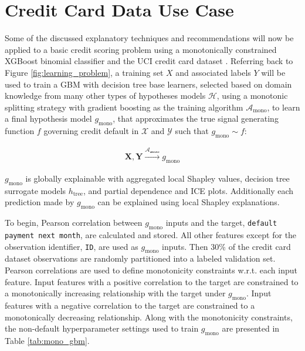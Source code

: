 \documentclass[11pt]{asaproc}
\begin{document}
\section{Credit Card Data Use Case} \label{sec:use_case}

Some of the discussed explanatory techniques and recommendations will now be applied to a basic credit scoring problem using a monotonically constrained XGBoost binomial classifier and the UCI credit card dataset \cite{uci}. Referring back to Figure \ref{fig:learning_problem}, a training set $X$ and associated labels $Y$ will be used to train a GBM with decision tree base learners, selected based on domain knowledge from many other types of hypotheses models $\mathcal{H}$, using a monotonic splitting strategy with gradient boosting as the training algorithm $\mathcal{A}_{\text{mono}}$, to learn a final hypothesis model $g_{\text{mono}}$, that approximates the true signal generating function $f$ governing credit default in $\mathcal{X}$ and $\mathcal{Y}$ such that $g_{\text{mono}} \sim f$:

\begin{equation}
\label{eq:cc_training}
\begin{aligned}
\mathbf{X}, \mathbf{Y} \xrightarrow{\mathcal{A_{\text{mono}}}} g_{\text{mono}}
\end{aligned}
\end{equation}

\noindent$g_{\text{mono}}$ is globally explainable with aggregated local Shapley values, decision tree surrogate models $h_{\text{tree}}$, and partial dependence and ICE plots. Additionally each prediction made by $g_{\text{mono}}$ can be explained using local Shapley explanations. 

To begin, Pearson correlation between $g_{\text{mono}}$ inputs and the target, \texttt{default payment next month}, are calculated and stored. All other features except for the observation identifier, \texttt{ID}, are used as $g_{\text{mono}}$ inputs. Then 30\% of the credit card dataset observations are randomly partitioned into a labeled validation set. Pearson correlations are used to define monotonicity constraints w.r.t. each input feature. Input features with a positive correlation to the target are constrained to a monotonically increasing relationship with the target under $g_{\text{mono}}$. Input features with a negative correlation to the target are constrained to a monotonically decreasing relationship. Along with the monotonicity constraints, the non-default hyperparameter settings used to train $g_{\text{mono}}$ are presented in Table \ref{tab:mono_gbm}. 
\end{document}
